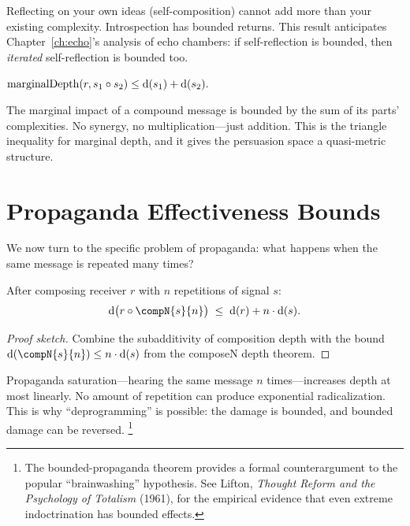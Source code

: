Reflecting on your own ideas (self-composition) cannot add more than your
existing complexity.  Introspection has bounded returns.  This result
anticipates Chapter~\ref{ch:echo}'s analysis of echo chambers: if
self-reflection is bounded, then \emph{iterated} self-reflection is
bounded too.

\begin{theorem}
\label{thm:marginal-triangle}
$\mathrm{marginalDepth}(r, s_1\circ s_2) \le \operatorname{d}(s_1) + \operatorname{d}(s_2).$
\end{theorem}

The marginal impact of a compound message is bounded by the sum of its
parts' complexities.  No synergy, no multiplication---just addition.  This
is the triangle inequality for marginal depth, and it gives the persuasion
space a quasi-metric structure.


\section{Propaganda Effectiveness Bounds}
\label{sec:pers-propaganda}

We now turn to the specific problem of propaganda: what happens when the
same message is repeated many times?

\begin{theorem}
\label{thm:bounded-propaganda}
After composing receiver $r$ with $n$ repetitions of signal $s$:
\[
  \depth\bigl(r\compose\compN{s}{n}\bigr)
  \;\le\;
  \depth(r) + n\cdot\depth(s).
\]
\end{theorem}

\begin{proof}[Proof sketch]
Combine the subadditivity of composition depth with the bound
$\depth(\compN{s}{n})\le n\cdot\depth(s)$ from the composeN depth theorem.
\end{proof}

Propaganda saturation---hearing the same message $n$ times---increases
depth at most linearly.  No amount of repetition can produce exponential
radicalization.  This is why ``deprogramming'' is possible: the damage is
bounded, and bounded damage can be reversed.%
\footnote{The bounded-propaganda theorem provides a formal counterargument
to the popular ``brainwashing'' hypothesis.  See Lifton,
\textit{Thought Reform and the Psychology of Totalism} (1961), for the
empirical evidence that even extreme indoctrination has bounded effects.}


